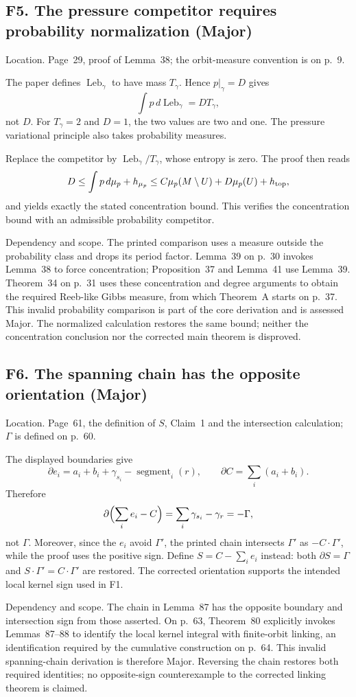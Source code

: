 \documentclass[10pt]{article}
\begin{document}
\subsection*{F5. The pressure competitor requires probability normalization (Major)}
Location. Page 29, proof of Lemma 38; the orbit-measure convention is on p. 9.\par
The paper defines \(\operatorname{Leb}_\gamma\) to have mass \(T_\gamma\). Hence \(p|_\gamma=D\) gives \[\int p\,d\operatorname{Leb}_\gamma=DT_\gamma,\] not \(D\). For \(T_\gamma=2\) and \(D=1\), the two values are two and one. The pressure variational principle also takes probability measures.\par
Replace the competitor by \(\operatorname{Leb}_\gamma/T_\gamma\), whose entropy is zero. The proof then reads \[D\le\int p\,d\mu_p+h_{\mu_p}
 \le C\mu_p(M\setminus U)+D\mu_p(U)+h_{\rm top},\] and yields exactly the stated concentration bound. This verifies the concentration bound with an admissible probability competitor.\par
Dependency and scope. The printed comparison uses a measure outside the probability class and drops its period factor. Lemma 39 on p. 30 invokes Lemma 38 to force concentration; Proposition 37 and Lemma 41 use Lemma 39. Theorem 34 on p. 31 uses these concentration and degree arguments to obtain the required Reeb-like Gibbs measure, from which Theorem A starts on p. 37. This invalid probability comparison is part of the core derivation and is assessed Major. The normalized calculation restores the same bound; neither the concentration conclusion nor the corrected main theorem is disproved.\par
\subsection*{F6. The spanning chain has the opposite orientation (Major)}
Location. Page 61, the definition of \(S\), Claim 1 and the intersection calculation; \(\Gamma\) is defined on p. 60.\par
The displayed boundaries give \[\partial e_i=a_i+b_i+\gamma_{s_i}-\operatorname{segment}_i(r),
 \qquad \partial C=\sum_i(a_i+b_i).\] Therefore \[\partial\Bigl(\sum_i e_i-C\Bigr)
   =\sum_i\gamma_{s_i}-\gamma_r=-\Gamma,\] not \(\Gamma\). Moreover, since the \(e_i\) avoid \(\Gamma'\), the printed chain intersects \(\Gamma'\) as \(-C\cdot\Gamma'\), while the proof uses the positive sign. Define \(S=C-\sum_i e_i\) instead: both \(\partial S=\Gamma\) and \(S\cdot\Gamma'=C\cdot\Gamma'\) are restored. The corrected orientation supports the intended local kernel sign used in F1.\par
Dependency and scope. The chain in Lemma 87 has the opposite boundary and intersection sign from those asserted. On p. 63, Theorem 80 explicitly invokes Lemmas 87–88 to identify the local kernel integral with finite-orbit linking, an identification required by the cumulative construction on p. 64. This invalid spanning-chain derivation is therefore Major. Reversing the chain restores both required identities; no opposite-sign counterexample to the corrected linking theorem is claimed.\par
\end{document}
